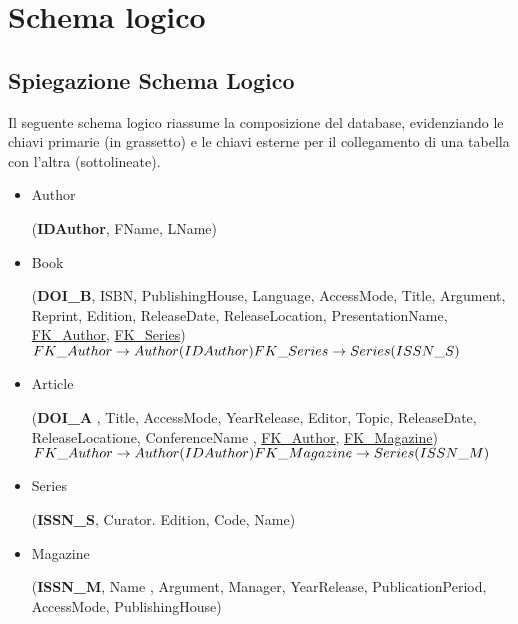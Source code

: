 \chapter{Schema logico}
	\section{Spiegazione Schema Logico}
	Il seguente schema logico riassume la composizione del database, evidenziando le chiavi primarie (in grassetto) e le chiavi esterne per il collegamento di una tabella con l'altra (sottolineate).
																			
\begin{itemize}
\subsection{Schema}

\item Author


(\textbf{IDAuthor}, FName, LName)




\item Book


(\textbf{DOI\_B}, ISBN, PublishingHouse, Language, AccessMode, Title, Argument, Reprint, Edition, ReleaseDate, ReleaseLocation, PresentationName, \underline{FK\_Author}, \underline{FK\_Series})\\

	$FK\_Author \rightarrow Author(IDAuthor)\\
	 FK\_Series \rightarrow Series(ISSN\_S)$


\item Article

(\textbf{DOI\_A} , Title, AccessMode, YearRelease, Editor, Topic, ReleaseDate, ReleaseLocatione, ConferenceName , \underline{FK\_Author}, \underline{FK\_Magazine})\\

$FK\_Author \rightarrow Author(IDAuthor) \\
	 FK\_Magazine \rightarrow Series(ISSN\_M)$

\item Series


(\textbf{ISSN\_S}, Curator. Edition, Code, Name)\\



\item Magazine


(\textbf{ISSN\_M}, Name , Argument, Manager, YearRelease, PublicationPeriod, AccessMode,
PublishingHouse)



\end{itemize}
